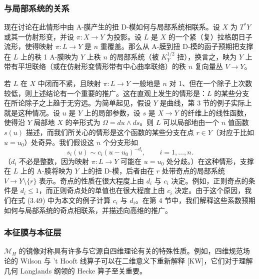 \documentclass[11pt,a4paper]{article}
\newcommand{\ii}{\mathrm{i}}
\begin{document}
\subsubsection{与局部系统的关系}

现在讨论在此情形中由 A-膜产生的扭 D-模如何与局部系统相联系。设 $X$ 为 $T^*Y$ 或其一仿射形变，并设 $\pi:X\to Y$ 为投影。设 $L$ 是 $X$ 的一个紧（复）拉格朗日子流形，使得映射 $\pi:L\to Y$ 是 $n$ 重覆盖。那么从 A-膜到扭 D-模的函子预期把支撑在 $L$ 上的秩 1 A-膜映为 $Y$ 上秩 $n$ 的局部系统（被 $K_Y^{1/2}$ 扭），换言之，映为 $Y$ 上带有平坦联络（或在仿射形变情形带有中心曲率联络）的秩 $n$ 复向量丛 $V\to Y$。


若 $L$ 在 $X$ 中闭而不紧，且映射 $\pi:L\to Y$ 一般地是 $n$ 对 1、但在一个除子上次数较低，则上述结论有一个重要的推广。这在直观上发生的情形是：$L$ 的某些分支在所论除子之上趋于无穷远。为简单起见，假设 $Y$ 是曲线，第 3 节的例子实际上就是这种情况。设 $u$ 是 $Y$ 上的局部参数，设 $s$ 是 $X\to Y$ 的纤维上的线性函数，使得沿 $Y$ 局部地 $X$ 的辛形式为 $\Omega=du\wedge ds$。则 $L$ 可以局部地由一个 $n$ 值函数 $s(u)$ 描述，而我们所关心的情形是这个函数的某些分支在点 $r\in Y$（对应于比如 $u=u_0$）处奇异。我们假设这 $n$ 个分支形如
\begin{equation}\tag{2.6}
s_i(u)\sim c_i(u-u_0)^{-d_i},\qquad i=1,\dots,n.
\end{equation}
（$d_i$ 不必是整数，因为映射 $\pi:L\to Y$ 可能在 $u=u_0$ 处分歧。）在这种情形，支撑在 $L$ 上的 A-膜将映为 $Y$ 上的扭 D-模，后者由在 $r$ 处带奇点的局部系统 $V\to Y\setminus\{r\}$ 表示。奇点的性质在很大程度上由 $d_i$ 与 $c_i$ 决定。例如，正则奇点的条件是 $d_i\le 1$，而正则奇点处的单值也在很大程度上由 $c_i$ 决定。由于这个原因，我们在式 (3.49) 中为本文的例子计算 $c_i$ 与 $d_i$。在第 4 节中，我们解释这些系数预期如何与局部系统的奇点相联系，并描述向高维的推广。

\subsubsection{本征膜与本征层}

$\mathcal{M}_H$ 的镜像对称具有许多与它源自四维理论有关的特殊性质。例如，四维规范场论的 Wilson 与 't Hooft 线算子可以在二维意义下重新解释 [KW]，它们对于理解几何 Langlands 纲领的 Hecke 算子至关重要。
\end{document}
